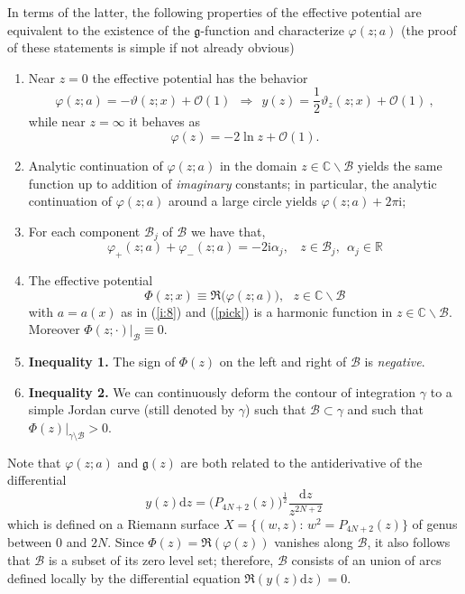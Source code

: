 \documentclass[10pt,reqno,oneside]{amsart}
\def \gg{{\mathfrak g}}
\renewcommand{\d}{{\mathrm d}}
\newcommand{\im}{\mathrm{i}}
\numberwithin{equation}{section}
\def\be{\begin{equation}}
\def\ee{\end{equation}}
\def\C{{\mathbb C}}
\def\eqref#1{(\ref{#1})}
\begin{document}
In terms of the latter, 
 the following properties of the effective potential are equivalent to the existence of the $\gg$-function and characterize  $\varphi(z;a)$ (the proof of these statements is simple if not already obvious)
 \begin{enumerate}
 \item Near $z=0$ the effective potential has the behavior 
 \begin{equation}\label{phiatzero}
 \varphi(z;a)= -\vartheta(z;x) + \mathcal O(1) \ \ \Rightarrow \ \ 
 y(z) = \frac 1 2 \vartheta_z(z;x) + \mathcal O(1)\ ,
 \end{equation}
 while near $z=\infty$ it behaves as 
 \be
 \varphi (z) = -2\ln z + \mathcal O(1).\label{phiatinfty}
 \ee
 \item  Analytic continuation of $\varphi(z;a)$ in the domain $z\in\C\backslash\mathcal B$ yields the same function up to addition of  {\em imaginary} constants; in particular, the analytic continuation of $\varphi(z;a)$ around a large circle yields $\varphi(z;a) + 2\pi\im$;
 \item For each component $\mathcal B_j$ of $\mathcal B$  we have that,
 \begin{equation*}
 \varphi_+ (z;a) + \varphi_-(z;a) = -2\im\alpha_j ,\ \ \  \ z\in \mathcal B_j,\ \ \alpha_j\in\mathbb{R}
 \end{equation*}
\item The effective potential 
\begin{equation}\label{effective}
	\Phi(z;x)\equiv \Re\big(\varphi (z;a)\big),\ \ \ z\in\mathbb{C}\backslash\mathcal{B}
\end{equation}
with $a=a(x)$ as in \eqref{i:8} and \eqref{pick} is a harmonic function in $z\in\C\backslash\mathcal B$. Moreover $\Phi(z;\cdot) \big|_{\mathcal B} \equiv 0$. 
\item {\bf Inequality 1.} The sign of $\Phi(z)$ on the left and right of $\mathcal B$ is {\em negative}.
\item {\bf Inequality 2.} We can continuously deform the contour of integration $\gamma$ to a simple Jordan curve (still denoted by $\gamma$)  such that $\mathcal B \subset \gamma$ and such that $\Phi(z)\big|_{\gamma \setminus \mathcal B} >0$.
 \end{enumerate}
 Note that $\varphi(z;a)$ and $\gg(z)$ are both related to the  antiderivative of the differential 
 \begin{equation*}
 	y(z)\d z=\big(P_{4N+2}(z)\big)^{\frac{1}{2}}\frac{\d z}{z^{2N+2}}
\end{equation*}
which is defined on a Riemann surface $X=\{(w,z):\,w^2=P_{4N+2}(z)\}$ of genus between $0$ and $2N$. Since $\Phi(z) = \Re(\varphi(z))$ vanishes along $\mathcal B$, it also follows that $\mathcal B$ is a subset of its zero level set; therefore, $\mathcal B$ consists of an union of arcs defined locally by the differential equation $\Re(y(z) \d z) =0$.
\end{document}
